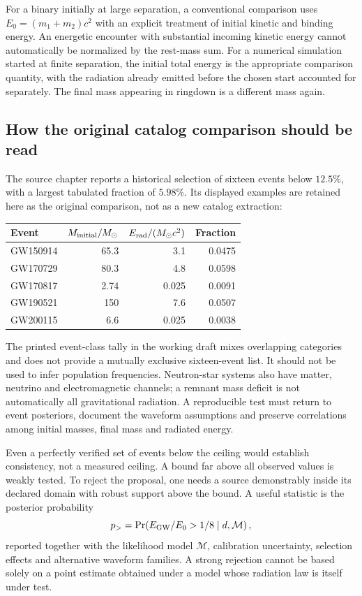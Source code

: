 For a binary initially at large separation, a conventional comparison uses $E_0=(m_1+m_2)c^2$ with an explicit treatment of initial kinetic and binding energy. An energetic encounter with substantial incoming kinetic energy cannot automatically be normalized by the rest-mass sum. For a numerical simulation started at finite separation, the initial total energy is the appropriate comparison quantity, with the radiation already emitted before the chosen start accounted for separately. The final mass appearing in ringdown is a different mass again.

\subsection{How the original catalog comparison should be read}
The source chapter reports a historical selection of sixteen events below $12.5\%$, with a largest tabulated fraction of $5.98\%$. Its displayed examples are retained here as the original comparison, not as a new catalog extraction:
\begin{center}
\small\setlength{\tabcolsep}{4pt}
\begin{tabular}{@{}lrrr@{}}
\toprule
Event & $M_{\rm initial}/M_\odot$ & $E_{\rm rad}/(M_\odot c^2)$ & Fraction\\
\midrule
GW150914 &65.3&3.1&0.0475\\
GW170729 &80.3&4.8&0.0598\\
GW170817 &2.74&0.025&0.0091\\
GW190521 &150&7.6&0.0507\\
GW200115 &6.6&0.025&0.0038\\
\bottomrule
\end{tabular}
\end{center}
The printed event-class tally in the working draft mixes overlapping categories and does not provide a mutually exclusive sixteen-event list. It should not be used to infer population frequencies. Neutron-star systems also have matter, neutrino and electromagnetic channels; a remnant mass deficit is not automatically all gravitational radiation. A reproducible test must return to event posteriors, document the waveform assumptions and preserve correlations among initial masses, final mass and radiated energy.

Even a perfectly verified set of events below the ceiling would establish consistency, not a measured ceiling. A bound far above all observed values is weakly tested. To reject the proposal, one needs a source demonstrably inside its declared domain with robust support above the bound. A useful statistic is the posterior probability
\begin{equation}
 p_{>}=\Pr\!\left(E_{\rm GW}/E_0>1/8\mid d,\mathcal M\right),
 \label{c11:ceilingtest}
\end{equation}
reported together with the likelihood model $\mathcal M$, calibration uncertainty, selection effects and alternative waveform families. A strong rejection cannot be based solely on a point estimate obtained under a model whose radiation law is itself under test.

